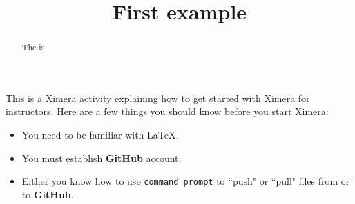 \documentclass{ximera}
\title{First example}
\begin{document}
\begin{abstract}
 The is 
\end{abstract}
\maketitle

This is a Ximera activity explaining how to get started with Ximera for instructors. 
  Here are a few things you should know before you start Ximera:
  
  \begin{itemize}
  \item You need to be familiar with \LaTeX.
  \item You must establish \textbf{GitHub} account.
  \item Either you know how to use \texttt{command prompt} to ``push" or ``pull" files from or to \textbf{GitHub}.
  \end{itemize}
\end{document}
